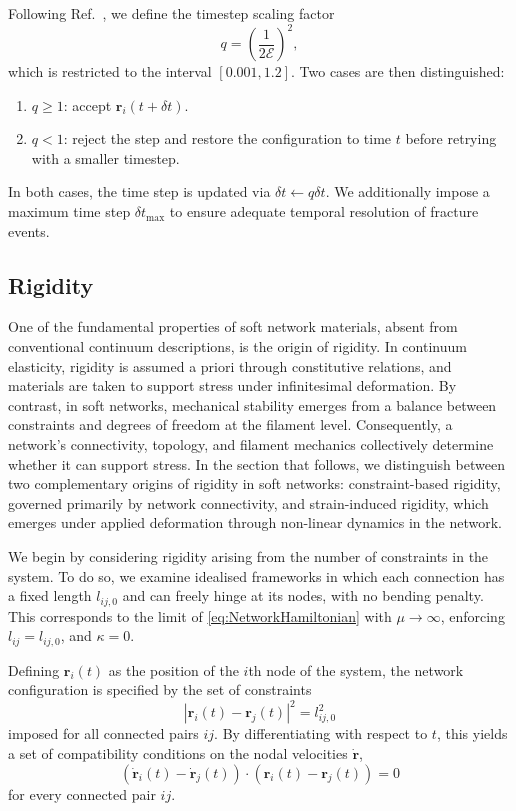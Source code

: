 \documentclass[asymmetricmargins]{library/duthesis}%
\begin{document}
Following Ref.~\cite{sammullerAdaptiveBrownianDynamics2021}, we define the timestep scaling factor
\begin{equation*}
    q = \left( \frac{1}{2\mathcal{E}} \right)^2,
\end{equation*}
which is restricted to the interval $[0.001, 1.2]$. Two cases are then distinguished:
\begin{enumerate}
    \item $q \geq 1$: accept $\bm{r}_i(t+\delta t)$.
    \item $q < 1$: reject the step and restore the configuration to time $t$ before retrying with a smaller timestep.
\end{enumerate}
In both cases, the time step is updated via $\delta t \gets q \delta t$. We additionally impose a maximum time step $\delta t_{\max}$ to ensure adequate temporal resolution of fracture events.

\subsection{Rigidity} \label{sec:Rigidity}

One of the fundamental properties of soft network materials, absent from conventional continuum descriptions, is the origin of rigidity. In continuum elasticity, rigidity is assumed a priori through constitutive relations, and materials are taken to support stress under infinitesimal deformation. By contrast, in soft networks, mechanical stability emerges from a balance between constraints and degrees of freedom at the filament level. Consequently, a network's connectivity, topology, and filament mechanics collectively determine whether it can support stress. In the section that follows, we distinguish between two complementary origins of rigidity in soft networks: constraint-based rigidity, governed primarily by network connectivity, and strain-induced rigidity, which emerges under applied deformation through non-linear dynamics in the network.

We begin by considering rigidity arising from the number of constraints in the system. To do so, we examine idealised frameworks in which each connection has a fixed length $l_{ij,0}$ and can freely hinge at its nodes, with no bending penalty. This corresponds to the limit of \cref{eq:NetworkHamiltonian} with $\mu \to \infty$, enforcing $l_{ij} = l_{ij,0}$, and $\kappa = 0$.

Defining $\bm{r}_i(t)$ as the position of the $i$th node of the system, the network configuration is specified by the set of constraints
\[|\bm{r}_i(t) - \bm{r}_j(t)|^2 = l_{ij,0}^2\] 
imposed for all connected pairs $ij$. By differentiating with respect to $t$, this yields a set of compatibility conditions on the nodal velocities $\dot{\bm{r}}$,
\begin{equation} \label{eq:FrameworkRigidity}
    (\bm{\dot{r}}_i(t) - \bm{\dot{r}}_j(t))\cdot(\bm{r}_i(t) - \bm{r}_j(t))=0
\end{equation}
for every connected pair $ij$.
\end{document}
